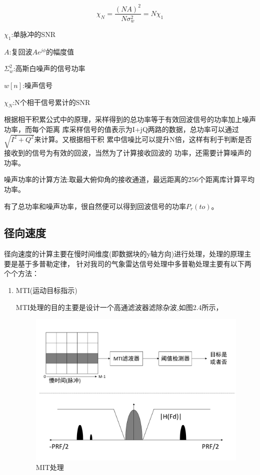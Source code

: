 \documentclass[a4paper,12pt]{report}
\begin{document}
\begin{spacing}{1.5}
\begin{proposition}[相干积累]
    \begin{equation}
        \chi_N=\frac{(NA)^2}{N\sigma_w^2}=N\chi_1
    \end{equation}

    $\chi_1$:单脉冲的SNR

    $A$:复回波$Ae^{j\phi}$的幅度值

    $\Sigma_w^2$:高斯白噪声的信号功率

    $w[n]$:噪声信号

    $\chi_N$:N个相干信号累计的SNR

\end{proposition}

根据相干积累公式中的原理，采样得到的总功率等于有效回波信号的功率加上噪声功率，而每个距离
库采样信号的值表示为I+jQ两路的数据，总功率可以通过$\sqrt{I^2+Q^2}$来计算。又根据相干积
累中信噪比可以提升N倍，这样有利于判断是否接收到的信号为有效的回波，当然为了计算接收回波的
功率，还需要计算噪声的功率。

噪声功率的计算方法:取最大俯仰角的接收通道，最远距离的256个距离库计算平均功率。

有了总功率和噪声功率，很自然便可以得到回波信号的功率$P_r(to)$。

\subsection{径向速度} 
径向速度的计算主要在慢时间维度(即数据块的y轴方向)进行处理，处理的原理主要是基于多普勒定律，
针对我司的气象雷达信号处理中多普勒处理主要有以下两个个方法：
\begin{enumerate}[1)]
    \itemindent=2em
    \item MTI(运动目标指示)
    
    \qquad MTI处理的目的主要是设计一个高通滤波器滤除杂波,如图2.4所示，

    \begin{figure}[hbtp]
    \centering
    \includegraphics [width=1.0\textwidth]{figure//MTI.pdf}
    \caption{MIT处理}\label{MTI}
    \end{figure}


\end{enumerate}
\end{spacing}
\end{document}
